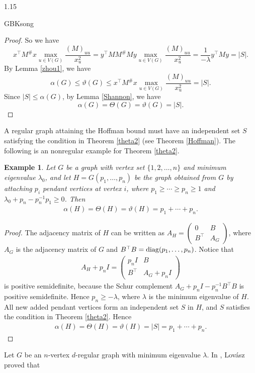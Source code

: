 \documentclass[preprint,12pt]{elsarticle}
\newtheorem{example}[thm]{Example}
\begin{document}
\begin{spacing}{1.15}
\begin{CJK*}{GBK}{song}
\begin{proof}
So we have
\[x^\top M^\#x\max_{u\in V(G)}\frac{(M)_{uu}}{x_u^2}=y^\top M{M^\# }My\mathop {\max }\limits_{u \in V\left( G \right)} \frac{{{{\left( M \right)}_{uu}}}}{{x_u^2}} =\frac{1}{-\lambda} {y^\top}My= |S|.\]
By Lemma \ref{zhou1}, we have
$$\alpha(G) \leq \vartheta(G)\leq x^\top M^\#x\max_{u\in V(G)}\frac{(M)_{uu}}{x_u^2}=  |S|.$$
Since $|S|\leq\alpha(G)$, by Lemma \ref{Shannon}, we have
\[\alpha (G) = \Theta \left( G \right) = \vartheta (G) = |S|.\]
\end{proof}
A regular graph attaining the Hoffman bound must have an independent set $S$ satisfying the condition in Theorem \ref{theta2} (see Theorem \ref{Hoffman}). The following is an nonregular example for Theorem \ref{theta2}.
\begin{example}
Let $G$ be a graph with vertex set $\{1,2,\ldots,n\}$ and minimum eigenvalue $\lambda_0$, and let $H=G(p_1,\ldots,p_n)$ be the graph obtained from $G$ by attaching $p_i$ pendant vertices at vertex $i$, where $p_1\geq\cdots\geq p_n\geq1$ and $\lambda_0+p_n-p_n^{-1}p_1\geq0$. Then
\begin{eqnarray*}
\alpha(H)=\Theta(H)=\vartheta(H)=p_1+\cdots+p_n.
\end{eqnarray*}
\end{example}
\begin{proof}
The adjacency matrix of $H$ can be written as $A_H=\begin{pmatrix}0&B\\B^\top&A_G\end{pmatrix}$, where $A_G$ is the adjacency matrix of $G$ and $B^\top B={\rm diag}(p_1,\ldots,p_n)$. Notice that
\begin{eqnarray*}
A_H+p_nI=\begin{pmatrix}p_nI&B\\B^\top&A_G+p_nI\end{pmatrix}
\end{eqnarray*}
is positive semidefinite, because the Schur complement $A_G+p_nI-p_n^{-1}B^\top B$ is positive semidefinite. Hence $p_n\geq-\lambda$, where $\lambda$ is the minimum eigenvalue of $H$. All new added pendant vertices form an independent set $S$ in $H$, and $S$ satisfies the condition in Theorem \ref{theta2}. Hence
\begin{eqnarray*}
\alpha(H)=\Theta(H)=\vartheta(H)=|S|=p_1+\cdots+p_n.
\end{eqnarray*}
\end{proof}
Let $G$ be an $n$-vertex $d$-regular graph with minimum eigenvalue $\lambda$. In \cite[Theorem 9]{L}, Lov\'{a}sz proved that

\end{CJK*}
\end{spacing}
\end{document}
